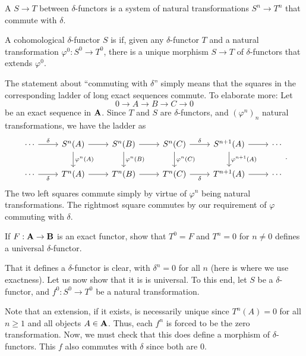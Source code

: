 \documentclass[12pt]{article}
\begin{document}
\begin{defn}
	A  $S \to T$ between $\delta$-functors is a system of natural transformations $S^{n} \to T^{n}$ that commute with $\delta$.

	A cohomological $\delta$-functor $S$ is  if, given any $\delta$-functor $T$ and a natural transformation $\varphi^{0} : S^{0} \to T^{0}$, there is a unique morphism $S \to T$ of $\delta$-functors that extends $\varphi^{0}$.
\end{defn}

\begin{rem}
	The statement about ``commuting with $\delta$'' simply means that the squares in the corresponding ladder of long exact sequences commute. To elaborate more: Let 
	\begin{equation*} 
		0 \to A \to B \to C \to 0
	\end{equation*}
	be an exact sequence in $\mathbf{A}$. Since $T$ and $S$ are $\delta$-functors, and $(\varphi^{n})_{n}$ natural transformations, we have the ladder as
	\begin{equation*} 
		\begin{tikzcd}
			\cdots \arrow[r, "\delta"] & S^{n}(A) \arrow[r] \arrow[d, "\varphi^{n}(A)"] & S^{n}(B) \arrow[r] \arrow[d, "\varphi^{n}(B)"] & S^{n}(C) \arrow[r, "\delta"] \arrow[d, "\varphi^{n}(C)"] & S^{n + 1}(A) \arrow[r] \arrow[d, "\varphi^{n + 1}(A)"] & \cdots \\
			\cdots \arrow[r, "\delta"'] & T^{n}(A) \arrow[r] & T^{n}(B) \arrow[r] & T^{n}(C) \arrow[r, "\delta"'] & T^{n + 1}(A) \arrow[r] & \cdots
		\end{tikzcd}.
	\end{equation*}
	The two left squares commute simply by virtue of $\varphi^{n}$ being natural transformations. The rightmost square commutes by our requirement of $\varphi$ commuting with $\delta$.
\end{rem}

\begin{exe}
	If $F : \mathbf{A} \to \mathbf{B}$ is an exact functor, show that $T^{0} = F$ and $T^{n} = 0$ for $n \neq 0$ defines a universal $\delta$-functor.
\end{exe}
\begin{soln} 
	That it defines a $\delta$-functor is clear, with $\delta^{n} = 0$ for all $n$ (here is where we use exactness). Let us now show that it is is universal. To this end, let $S$ be a $\delta$-functor, and $f^{0} : S^{0} \to T^{0}$ be a natural transformation.

	Note that an extension, if it exists, is necessarily unique since $T^{n}(A) = 0$ for all $n \ge 1$ and all objects $A \in \mathbf{A}$. Thus, each $f^{n}$ is forced to be the zero transformation. Now, we must check that this does define a morphism of $\delta$-functors. This $f$ also commutes with $\delta$ since both are $0$.
\end{soln}
\end{document}
